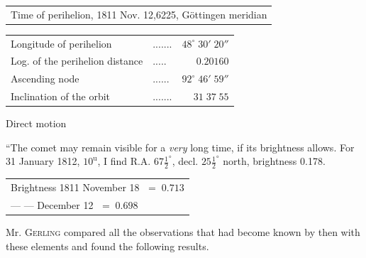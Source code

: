 \begin{center}\fontsize{10}{12}\selectfont\setlength{\tabcolsep}{4pt}\renewcommand{\arraystretch}{1.15}\begin{tabular}{l}
Time of perihelion, 1811 Nov. 12,6225, Göttingen meridian\\
\end{tabular}\end{center}
\begin{center}\fontsize{10}{12}\selectfont\setlength{\tabcolsep}{3pt}\renewcommand{\arraystretch}{1.15}\begin{tabular}{llr}
Longitude of perihelion & .\;.\;.\;.\;.\;.\;. & $48^\circ\;30'\;20''$\\
Log. of the perihelion distance & .\;.\;.\;.\;. & $0.20160$\\
Ascending node & .\;.\;.\;.\;.\;. & $92^\circ\;46'\;59''$\\
Inclination of the orbit & .\;.\;.\;.\;.\;.\;. & $31\;37\;55$\\
\end{tabular}\end{center}
\noindent Direct motion


\par\indent “The comet may remain visible for a \emph{very} long time, if its brightness allows. For 31 January 1812, $10^{\mathrm u}$, I find R.A. $67\frac{1}{2}^\circ$, decl. $25\frac{1}{2}^\circ$ north, brightness 0.178.

\begin{center}
\begin{tabular}{l}
Brightness 1811 November 18 $\;=\;0.713$ \\
\qquad --- \qquad --- December 12 $\;=\;0.698$ \\
\end{tabular}
\end{center}


\par\indent Mr. \textsc{Gerling} compared all the observations that had become known by then with these elements and found the following results.

